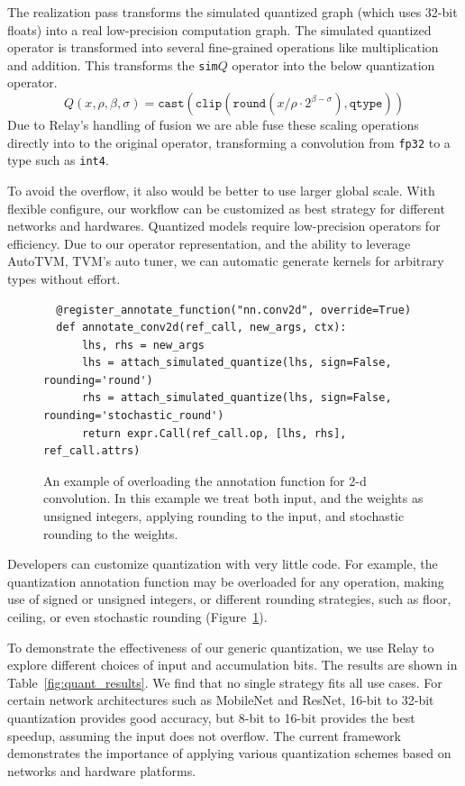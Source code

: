 The realization pass transforms the simulated quantized graph
  (which uses 32-bit floats)
  into a real low-precision computation graph.
The simulated quantized operator is transformed
  into several fine-grained operations like multiplication and addition.
This transforms the \texttt{sim$Q$} operator into the below quantization operator.
\[
  Q\left(x, \rho, \beta, \sigma\right) = \texttt{cast}\left(\texttt{clip}\left(\texttt{round}\left(x / \rho \cdot 2^{\beta-\sigma}\right), \texttt{qtype}\right)\right)
\]
Due to Relay's handling of fusion
  we are able fuse these scaling operations directly into
  to the original operator, transforming a convolution
  from \verb|fp32| to a type such as \verb|int4|.

To avoid the overflow, it also would be better to use larger global scale.
 With flexible configure, our workflow can be customized as best strategy for
 different networks and hardwares.
Quantized models require low-precision operators for efficiency. Due to our operator representation,
and the ability to leverage AutoTVM, TVM's auto tuner, we can automatic generate kernels for arbitrary
types without effort.

\begin{figure}[t]
  \begin{verbatim}
  @register_annotate_function("nn.conv2d", override=True)
  def annotate_conv2d(ref_call, new_args, ctx):
      lhs, rhs = new_args
      lhs = attach_simulated_quantize(lhs, sign=False, rounding='round')
      rhs = attach_simulated_quantize(lhs, sign=False, rounding='stochastic_round')
      return expr.Call(ref_call.op, [lhs, rhs], ref_call.attrs)
  \end{verbatim}
  \caption{
    An example of overloading the annotation function for 2-d convolution.
    In this example we treat both input, and the weights as unsigned integers,
    applying rounding to the input, and stochastic rounding to the weights.}
  \label{fig:annotate_conv}
\end{figure}

Developers can customize quantization with very little code.
For example, the quantization annotation function may be overloaded for any operation,
  making use of signed or unsigned integers, or different rounding strategies, such as
  floor, ceiling, or even stochastic rounding (Figure~\ref{fig:annotate_conv}).

To demonstrate the effectiveness of our generic quantization,
  we use Relay to explore
  different choices of input and accumulation bits.
The results are shown in Table~\ref{fig:quant_results}.
We find that no single strategy fits all use cases.
For certain network architectures such as MobileNet and ResNet, 16-bit to 32-bit
  quantization provides good accuracy,
   but 8-bit to 16-bit provides the best speedup,
  assuming the input does not overflow.
The current framework demonstrates the importance of applying
  various quantization schemes based on networks and hardware platforms.

